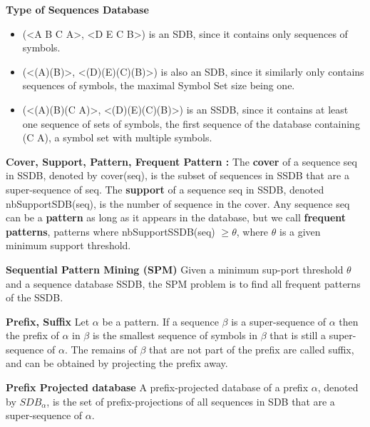 \documentclass{eplmastersthesis}
\begin{document}
\begin{example}{\bfseries Type of Sequences Database}
\begin{itemize}
\item (<A B C A>, <D E C B>) is an SDB, since it contains only sequences of symbols.
\item (<(A)(B)>, <(D)(E)(C)(B)>) is also an SDB, since it similarly only contains sequences of symbols, the maximal Symbol Set size being one. 
\item (<(A)(B)(C A)>, <(D)(E)(C)(B)>) is an SSDB, since it contains at least one sequence of sets of symbols, the first sequence of the database containing (C A), a symbol set with multiple symbols.
\end{itemize}
\end{example}

\begin{definition}{\bfseries Cover, Support, Pattern, Frequent Pattern :}
The \textbf{cover} of a sequence seq in SSDB, denoted by cover(seq), is the subset of sequences in SSDB that are a super-sequence of seq. 
The \textbf{support} of a sequence seq in SSDB, denoted nbSupportSDB(seq), is the number of sequence in the cover. 
Any sequence seq can be a \textbf{pattern} as long as it appears in the database, but we call \textbf{frequent patterns}, patterns where nbSupportSSDB(seq) $\geq \theta$, where $\theta$ is a
given minimum support threshold.
\end{definition}

\begin{definition}{\bfseries Sequential Pattern Mining (SPM)}
Given a minimum sup-port threshold $\theta$ and a sequence database SSDB, the SPM problem is to find all frequent patterns of the SSDB.
\end{definition}

\begin{definition}{\bfseries Prefix, Suffix}
Let $\alpha$ be a pattern. If a sequence  $\beta$ is a super-sequence of $\alpha$ then the prefix of $\alpha$ in $\beta$ is the smallest sequence of symbols in $\beta$ that is still a super-sequence of $\alpha$. The remains of $\beta$ that are not part of the prefix are called suffix, and can be obtained by projecting the prefix away.
\end{definition}

\begin{definition}{\bfseries Prefix Projected database}
A prefix-projected database of a prefix $\alpha$, denoted by $SDB_\alpha$, is the set of prefix-projections of all sequences in SDB that are a super-sequence of $\alpha$.
\end{definition}
\end{document}
